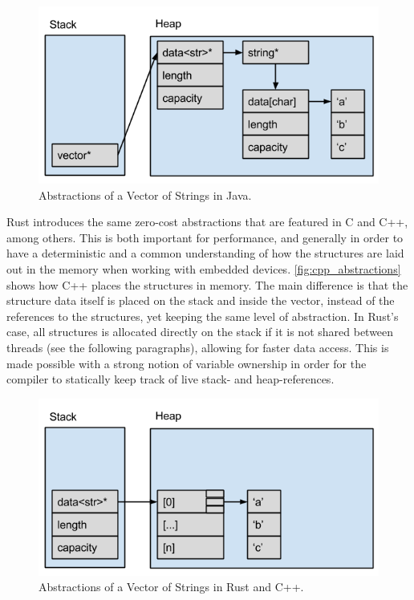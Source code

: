 \begin{figure}[tb]
  \begin{center}
    \includegraphics[scale=0.5]{figures/java_abstractions}
  \end{center}
  \caption{Abstractions of a Vector of Strings in Java.}
  \label{fig:java_abstractions}
\end{figure}

Rust introduces the same zero-cost abstractions that are featured in C and C++, among others. This
is both important for performance, and generally in order to have a deterministic and a common
understanding of how the structures are laid out in the memory when working with embedded devices.
\autoref{fig:cpp_abstractions} shows how C++ places the structures in memory. The main difference
is that the structure data itself is placed on the stack and inside the vector, instead of the
references to the structures, yet keeping the same level of abstraction. In Rust's case, all
structures is allocated directly on the stack if it is not shared between threads (see the following
paragraphs), allowing for faster data access. This is made possible with a strong notion of variable
ownership in order for the compiler to statically keep track of live stack- and heap-references.

\begin{figure}[tb]
  \begin{center}
    \includegraphics[scale=0.5]{figures/cpp_abstractions}
  \end{center}
  \caption{Abstractions of a Vector of Strings in Rust and C++.}
  \label{fig:cpp_abstractions}
\end{figure}

